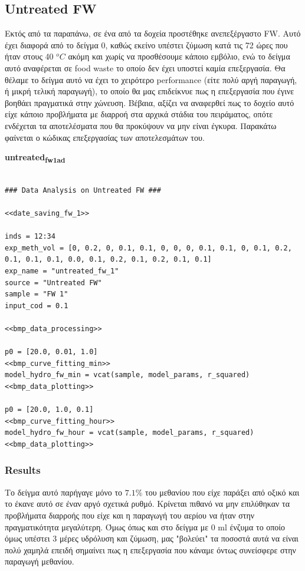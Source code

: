 \documentclass[11pt]{article}
\begin{document}
\subsection{Untreated FW}
\label{sec:orgd195c81}
Εκτός από τα παραπάνω, σε ένα από τα δοχεία προστέθηκε ανεπεξέργαστο FW. Αυτό έχει διαφορά από το δείγμα 0, καθώς εκείνο υπέστει ζύμωση κατά τις 72 ώρες που ήταν στους 40 \(^oC\) ακόμη και χωρίς να προσθέσουμε κάποιο εμβόλιο, ενώ το δείγμα αυτό αναφέρεται σε food waste το οποίο δεν έχει υποστεί καμία επεξεργασία. Θα θέλαμε το δείγμα αυτό να έχει το χειρότερο performance (είτε πολύ αργή παραγωγή, ή μικρή τελική παραγωγή), το οποίο θα μας επιδείκνυε πως η επεξεργασία που έγινε βοηθάει πραγματικά στην χώνευση. Βέβαια, αξίζει να αναφερθεί πως το δοχείο αυτό είχε κάποιο προβλήματα με διαρροή στα αρχικά στάδια του πειράματος, οπότε ενδέχεται τα αποτελέσματα που θα προκύψουν να μην είναι έγκυρα. Παρακάτω φαίνεται ο κώδικας επεξεργασίας των αποτελεσμάτων του.

\textbf{untreated\textsubscript{fw}\textsubscript{1}\textsubscript{ad}}
\begin{verbatim}

### Data Analysis on Untreated FW ###

<<date_saving_fw_1>>

inds = 12:34
exp_meth_vol = [0, 0.2, 0, 0.1, 0.1, 0, 0, 0, 0.1, 0.1, 0, 0.1, 0.2, 0.1, 0.1, 0.1, 0.0, 0.1, 0.2, 0.1, 0.2, 0.1, 0.1]
exp_name = "untreated_fw_1"
source = "Untreated FW"
sample = "FW 1"
input_cod = 0.1

<<bmp_data_processing>>

p0 = [20.0, 0.01, 1.0]
<<bmp_curve_fitting_min>>
model_hydro_fw_min = vcat(sample, model_params, r_squared)
<<bmp_data_plotting>>

p0 = [20.0, 1.0, 0.1]
<<bmp_curve_fitting_hour>>
model_hydro_fw_hour = vcat(sample, model_params, r_squared)
<<bmp_data_plotting>>
\end{verbatim}

\subsubsection{Results}
\label{sec:orgf358f63}
Το δείγμα αυτό παρήγαγε μόνο το \(7.1 \%\) του μεθανίου που είχε παράξει από οξικό και το έκανε αυτό σε έναν αργό σχετικά ρυθμό. Κρίνεται πιθανό να μην επιλύθηκαν τα προβλήματα διαρροής που είχε και η παραγωγή του αερίου να ήταν στην πραγματικότητα μεγαλύτερη. Όμως όπως και στο δείγμα με 0 ml ένζυμα το οποίο όμως υπέστει 3 μέρες υδρόλυση και ζύμωση, μας "βολεύει" τα ποσοστά αυτά να είναι πολύ χαμηλά επειδή σημαίνει πως η επεξεργασία που κάναμε όντως συνείσφερε στην παραγωγή μεθανίου.
\end{document}
